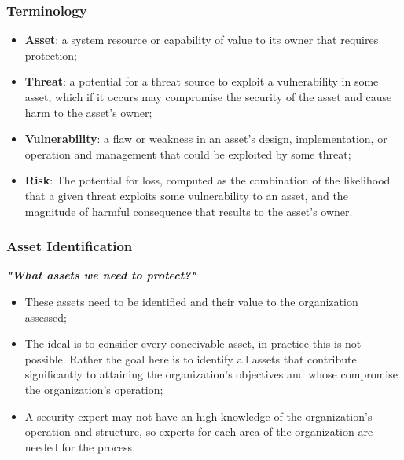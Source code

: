 \documentclass[xcolor ={table,usenames,dvipsnames}]{beamer}
\theoremstyle{definition}
\begin{document}
	\begin{frame}
		\frametitle{Terminology}
			\begin{itemize}
				\item \textbf{Asset}: a system resource or capability of value to its owner that requires protection; 
				\item \textbf{Threat}: a potential for a threat source to exploit a vulnerability in some asset, which if it occurs may compromise the security of the asset and cause harm to the asset’s owner;
				\item \textbf{Vulnerability}: a flaw or weakness in an asset’s design, implementation, or operation and management that could be exploited by some threat;
				\item \textbf{Risk}: The potential for loss, computed as the 	combination of the likelihood that a given threat exploits some vulnerability to an asset, and the magnitude of harmful consequence that results to the asset’s owner.
			\end{itemize}
	\end{frame}

	\begin{frame}
		\frametitle{Asset Identification}
		\textit{\textbf{"What assets we need to protect?"}}
		\begin{itemize}
			\item These assets need to be identified and their value to the organization assessed;
			\item The ideal is to consider every conceivable asset, in practice this is not possible. Rather the goal here is to identify all assets that contribute significantly to attaining the organization’s objectives and whose compromise the organization’s operation; 
			\item A security expert may not have an high knowledge of the organization's operation and structure, so experts for each area of the organization are needed for the process.
		\end{itemize}
	\end{frame}
	
\end{document}
